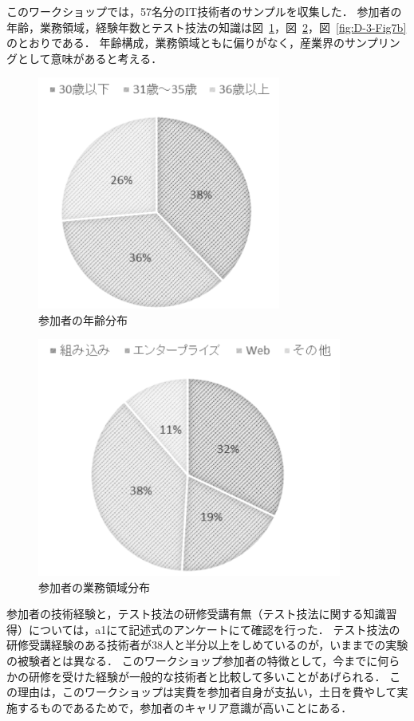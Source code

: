 このワークショップでは，57名分のIT技術者のサンプルを収集した．
参加者の年齢，業務領域，経験年数とテスト技法の知識は図~\ref{fig:D-3-Fig6}，図~\ref{fig:D-3-Fig7}，図~\ref{fig:D-3-Fig7b}のとおりである．
年齢構成，業務領域ともに偏りがなく，産業界のサンプリングとして意味があると考える．

\begin{figure}[H]
\begin{center}
\includegraphics[width=8cm]{./image/D-3-Fig6.png}
\caption{参加者の年齢分布}
\label{fig:D-3-Fig6}
\end{center}
\end{figure}

\begin{figure}[H]
\begin{center}
\includegraphics[width=10cm]{./image/D-3-Fig7.png}
\caption{参加者の業務領域分布}
\label{fig:D-3-Fig7}
\end{center}
\end{figure}

参加者の技術経験と，テスト技法の研修受講有無（テスト技法に関する知識習得）については，a1にて記述式のアンケートにて確認を行った．
テスト技法の研修受講経験のある技術者が38人と半分以上をしめているのが，いままでの実験の被験者とは異なる．
このワークショップ参加者の特徴として，今までに何らかの研修を受けた経験が一般的な技術者と比較して多いことがあげられる．
この理由は，このワークショップは実費を参加者自身が支払い，土日を費やして実施するものであるためで，参加者のキャリア意識が高いことにある．

